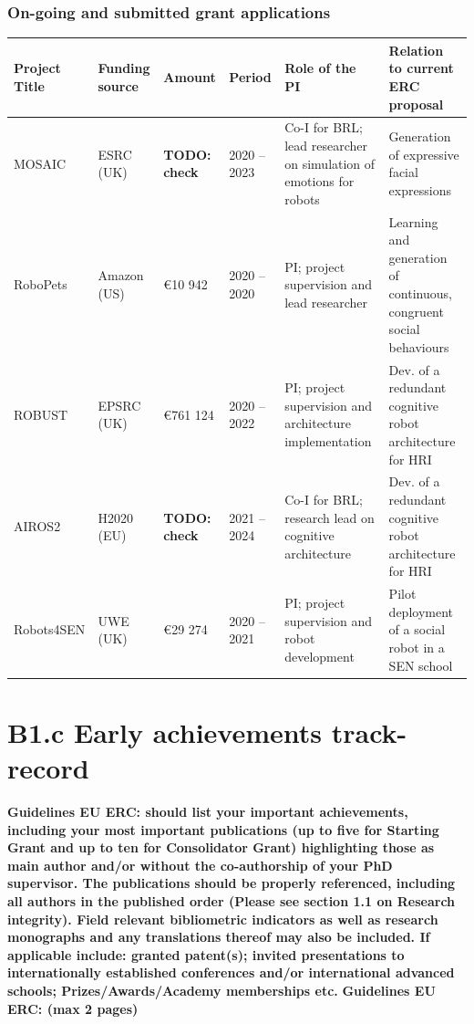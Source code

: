 \documentclass[11pt,a4paper]{report}
\newcommand{\TODO}[1]{{\color{red}\textbf{TODO: #1}}}
\newcommand{\eu}[1]{{\color{teal}\textbf{Guidelines EU ERC: #1}}}
\begin{document}
\subsection{On-going and submitted grant applications}

\begin{tabular}{llllp{4cm}p{4cm}}
\toprule
\textbf{Project Title} & \textbf{Funding source} & \textbf{Amount} & \textbf{Period} & \textbf{Role of the PI} & \textbf{Relation to current  ERC proposal} \\ \midrule
    MOSAIC & ESRC (UK) & \TODO{check} & 2020 -- 2023 & Co-I for BRL; lead researcher on simulation of emotions for robots & Generation of expressive facial expressions \\ \midrule
    RoboPets & Amazon (US) & €10 942 & 2020 -- 2020 & PI; project supervision and lead researcher & Learning and generation of continuous, congruent social behaviours \\ \midrule
    ROBUST & EPSRC (UK) & €761 124 & 2020 -- 2022 & PI; project supervision and
    architecture implementation & Dev. of a redundant cognitive robot architecture for HRI \\ \midrule
    AIROS2 & H2020 (EU) & \TODO{check} & 2021 -- 2024 & Co-I for BRL; research
    lead on cognitive architecture & Dev. of a redundant cognitive robot architecture for HRI \\ \midrule
    Robots4SEN & UWE (UK) & €29 274 & 2020 -- 2021 & PI; project supervision and robot development & Pilot deployment of a social robot in a SEN school \\ \bottomrule
\end{tabular}




\newpage
\chapter{B1.c Early achievements track-record}\label{early-achievements-track-record}

\eu{should list your important achievements,
including your most important publications (up to five for Starting Grant and up to ten for
Consolidator Grant) highlighting those as main author and/or without the co-authorship of your PhD
supervisor. The publications should be properly referenced, including all authors in the published
order (Please see section 1.1 on Research integrity). Field relevant bibliometric indicators as well as
research monographs and any translations thereof may also be included. If applicable include:
granted patent(s); invited presentations to internationally established conferences and/or
international advanced schools; Prizes/Awards/Academy memberships etc.}
\eu{(max 2 pages)}
\end{document}
